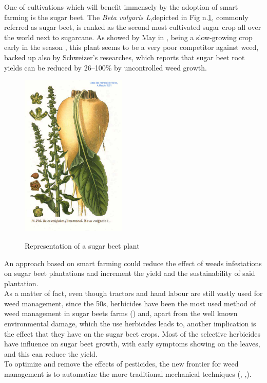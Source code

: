 One of cultivations which will benefit immensely by the adoption of smart farming is the sugar beet. The \textit{Beta vulgaris L},depicted in Fig n.\ref{fig:sugar_beet}, commonly referred as sugar beet, is ranked as the second most cultivated  sugar crop all over the world next to sugarcane\cite{bhadra_weed_2020}. As showed by May in \cite{may_economic_2003}, being a slow-growing crop early in the season \cite{bhadra_weed_2020}, this plant seems to be a very poor competitor against weed, backed up also by Schweizer's researches, which reports that sugar beet root yields can be reduced by 26–100\% by uncontrolled weed growth.  \cite{schweizer_weed_1989}\\
\begin{figure}[ht]
	\centering
	\includegraphics[width = 5cm]{img/276_Beta_vulgaris_L.jpg}
	\caption[Representation of a sugar beet plant]{Representation of a sugar beet plant \cite{masclef_sugar_1891} }{\centering}
	\label{fig:sugar_beet}
\end{figure}
An approach based on smart farming could reduce the effect of weeds infestations on sugar beet plantations and  increment the yield and the sustainability of said plantation.\\
As a matter of fact, even though tractors and hand labour are still vastly used for weed management, since the 50s, herbicides have been the most used method of weed management in sugar beets farms (\cite{cioni_weed_2010}) and, apart from the well known environmental damage, which the use herbicides leads to, another implication is the effect that they have on the sugar beet crops. Most of the selective herbicides have influence on sugar beet growth, with early symptoms showing on the leaves, and this can reduce the yield. \cite{petersen_review_2004}\\
To optimize and remove the effects of pesticides, the new frontier for weed management is to automatize the more traditional mechanical techniques (\cite{raja_real-time_2020}, \cite{frasconi_design_2014},\cite{machleb_sensor-based_2021}).\\
